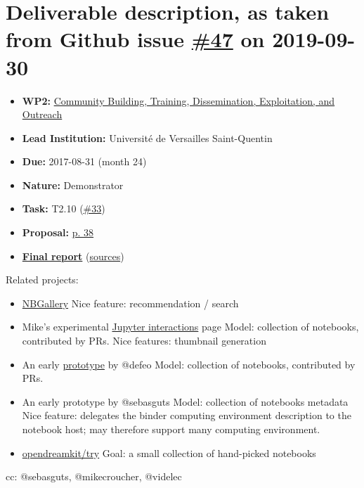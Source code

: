 \hypertarget{deliverable-description-as-taken-from-github-issue-47-on-2019-09-30}{%
\section*{\texorpdfstring{Deliverable description, as taken from Github
issue
\href{https://github.com/OpenDreamKit/OpenDreamKit/issues/47}{\#47} on
2019-09-30}{Deliverable description, as taken from Github issue \#47 on 2019-09-30}}\label{deliverable-description-as-taken-from-github-issue-47-on-2019-09-30}}

\begin{itemize}
\tightlist
\item
  \textbf{WP2:}
  \href{https://github.com/OpenDreamKit/OpenDreamKit/tree/master/WP2}{Community
  Building, Training, Dissemination, Exploitation, and Outreach}
\item
  \textbf{Lead Institution:} Université de Versailles Saint-Quentin
\item
  \textbf{Due:} 2017-08-31 (month 24)
\item
  \textbf{Nature:} Demonstrator
\item
  \textbf{Task:} T2.10
  (\href{https://github.com/OpenDreamKit/OpenDreamKit/issues/33}{\#33})
\item
  \textbf{Proposal:}
  \href{https://github.com/OpenDreamKit/OpenDreamKit/raw/master/Proposal/proposal-www.pdf}{p.
  38}
\item
  \textbf{\href{https://github.com/OpenDreamKit/OpenDreamKit/raw/master/WP2/D2.7/report-final.pdf}{Final
  report}}
  (\href{https://github.com/OpenDreamKit/OpenDreamKit/raw/master/WP2/D2.7/}{sources})
\end{itemize}

Related projects:

\begin{itemize}
\tightlist
\item
  \href{https://nbgallery.github.io/}{NBGallery} Nice feature:
  recommendation / search
\item
  Mike's experimental
  \href{https://mikecroucher.github.io/jupyter-interactions/}{Jupyter
  interactions} page Model: collection of notebooks, contributed by PRs.
  Nice features: thumbnail generation
\item
  An early \href{https://defeo.lu/jupyter/}{prototype} by @defeo Model:
  collection of notebooks, contributed by PRs.
\item
  An early prototype by @sebasguts Model: collection of notebooks
  metadata Nice feature: delegates the binder computing environment
  description to the notebook host; may therefore support many computing
  environment.
\item
  \href{https://github.com/OpenDreamKit/OpenDreamKit.github.io/issues/73}{opendreamkit/try}
  Goal: a small collection of hand-picked notebooks
\end{itemize}

cc: @sebasguts, @mikecroucher, @videlec
